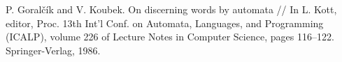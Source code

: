 	 P. Goralčík and V. Koubek. On discerning words by automata // In L. Kott, editor, Proc. 13th Int’l Conf. on Automata, Languages, and Programming (ICALP), volume 226 of Lecture Notes in Computer Science, pages 116–122. Springer-Verlag, 1986.
